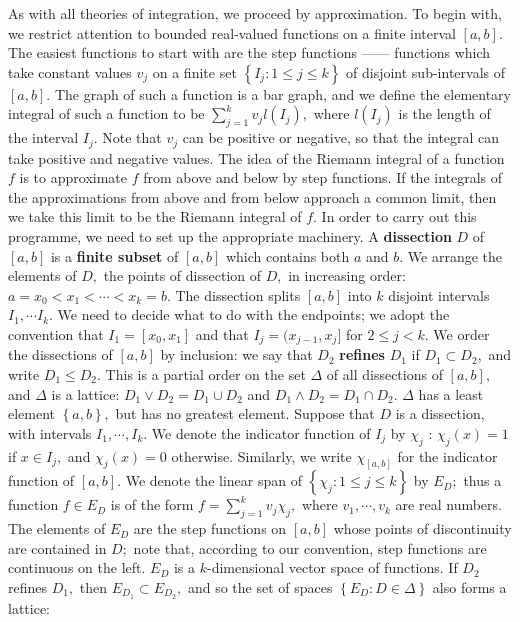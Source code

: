\documentclass[12pt]{book}
\theoremstyle{definition}\newtheorem{dfn}{Définition}[chapter]
\theoremstyle{plain}\newtheorem{thm}{Théorème}[chapter]
\theoremstyle{plain}\newtheorem{prp}{Proposition}[chapter]
\theoremstyle{plain}\newtheorem{lem}{\bf Lemme}[chapter]
\theoremstyle{plain}\newtheorem{axm}{\bf Axiome}[chapter]
\theoremstyle{plain}\newtheorem{lmm}{\bf Lemme}[chapter]
\theoremstyle{plain}\newtheorem{cor}{\bf Corollaire}[chapter]
\theoremstyle{remark}\newtheorem{rem}{Remarque}[chapter]
\begin{document}
As with all theories of integration, we proceed by approximation. To
begin with, we restrict attention to bounded real-valued functions on
a finite interval $[a, b].$ The easiest functions to start with are
the step functions —— functions which take constant values $v_j$ on a
finite set $\left\{I_j : 1 \le j \le k\right\}$ of disjoint
sub-intervals of $[a, b].$ The graph of such a function is a bar
graph, and we define the elementary integral of such a function to be
$\sum^k_{j=1} v_jl(I_j),$ where $l(I_j)$ is the length of the interval
$I_j.$ Note that $v_j$ can be positive or negative, so that the
integral can take positive and negative values. The idea of the
Riemann integral of a function $f$ is to approximate $f$ from above
and below by step functions. If the integrals of the approximations
from above and from below approach a common limit, then we take this
limit to be the Riemann integral of $f.$ In order to carry out this
programme, we need to set up the appropriate machinery. A
{\bf{dissection}} $D$ of $[a, b]$ is a {\bf finite subset} of $[a, b]$ which contains both $a$ and $b.$ We arrange the elements of $D,$ the points of dissection of $D,$ in increasing order: $a = x_0 < x_1 < \cdots < x_k = b.$ The dissection splits $[a, b]$ into $k$ disjoint intervals $I_1,\cdots I_k.$ We need to decide what to do with the endpoints; we adopt the convention that $I_1 = [x_0, x_1]$ and that $I_j = (x_{j−1}, x_j ]$ for $2 \le j<k.$
We order the dissections of $[a, b]$ by inclusion: we say that $D_2$ {\bf{refines}} $D_1$ if $D_1 \subset D_2,$ and write $D_1 \le D_2.$ This is a partial order on the set $\Delta$ of all dissections of $[a, b],$ and $\Delta$ is a lattice: $D_1\vee D_2 = D_1 \cup D_2$ and $D_1 \wedge D_2 = D_1 \cap D_2.$ $\Delta$ has a least element $\left\{a, b\right\},$ but has no greatest element.
Suppose that $D$ is a dissection, with intervals $I_1,\cdots,I_k.$ We denote the indicator function of $I_j$ by $\chi_j$ : $\chi_j (x) = 1$ if $x \in I_j,$ and $\chi_j (x) = 0$ otherwise. Similarly, we write $\chi_{[a,b]}$ for the indicator function of $[a, b].$ We denote the linear span of $\left\{\chi_j : 1 \le j \le k\right\}$ by $E_D;$ thus a function $f \in E_D$ is of the form $f =\sum^k _{j=1} v_j\chi_j ,$ where $v_1,\cdots,v_k$ are real numbers. The elements of $E_D$ are the step functions on $[a, b]$ whose points of discontinuity are contained in $D;$ note that, according to our convention, step functions are continuous on the left. $E_D$ is a $k$-dimensional vector space of functions. If $D_2$ refines $D_1,$ then $E_{D_1} \subset E_{D_2},$ and so the set of spaces $\left\{E_D : D \in \Delta\right\}$ also forms a lattice:
\end{document}
